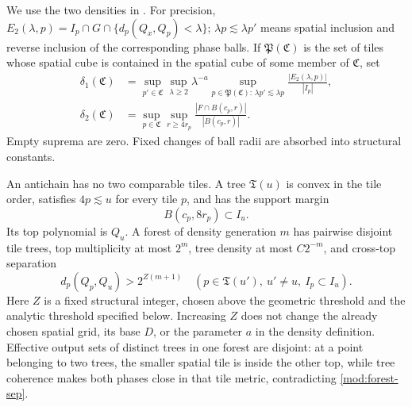 \documentclass[11pt]{article}
\numberwithin{equation}{section}
\theoremstyle{remark}
\theoremstyle{definition}
\newcommand{\TT}{\mathfrak T}
\begin{document}
We use the two densities in \cite[(2.24)--(2.27)]{BDJST}. For precision,
$E_2(\lambda,p)=I_p\cap G\cap\{d_p(Q_x,Q_p)<\lambda\}$;
$\lambda p\lesssim\lambda p'$ means spatial inclusion and reverse
inclusion of the corresponding phase balls. If $\mathfrak P(\mathfrak C)$
is the set of tiles whose spatial cube is contained in the spatial cube
of some member of $\mathfrak C$, set
\begin{align}
 \delta_1(\mathfrak C)
 &=\sup_{p'\in\mathfrak C}\sup_{\lambda\ge2}\lambda^{-a}
   \sup_{p\in\mathfrak P(\mathfrak C):\,\lambda p'\lesssim\lambda p}
   \frac{|E_2(\lambda,p)|}{|I_p|},\label{mod:density1}\\
 \delta_2(\mathfrak C)
 &=\sup_{p\in\mathfrak C}\sup_{r\ge4r_p}
   \frac{|F\cap B(c_p,r)|}{|B(c_p,r)|}.\label{mod:density2}
\end{align}
Empty suprema are zero. Fixed changes of ball radii are absorbed into
structural constants.

An antichain has no two comparable tiles. A tree $\TT(u)$ is convex in
the tile order, satisfies $4p\lesssim u$ for every tile $p$, and has the
support margin
\begin{equation}\label{mod:top-margin}
 B(c_p,8r_p)\subset I_u.
\end{equation}
Its top polynomial is $Q_u$. A forest of density generation $m$ has
pairwise disjoint tile trees, top multiplicity at most $2^m$, tree
density at most $C2^{-m}$, and cross-top separation
\begin{equation}\label{mod:forest-sep}
 d_p(Q_p,Q_u)>2^{Z(m+1)}
 \quad(p\in\TT(u'),\ u'\ne u,\ I_p\subset I_u).
\end{equation}
Here $Z$ is a fixed structural integer, chosen above the geometric
threshold and the analytic threshold specified below. Increasing $Z$
does not change the already chosen spatial grid, its base $D$, or the
parameter $a$ in the density definition. Effective output
sets of distinct trees in one forest are disjoint: at a point belonging
to two trees, the smaller spatial tile is inside the other top, while
tree coherence makes both phases close in that tile metric, contradicting
\eqref{mod:forest-sep}.
\end{document}
